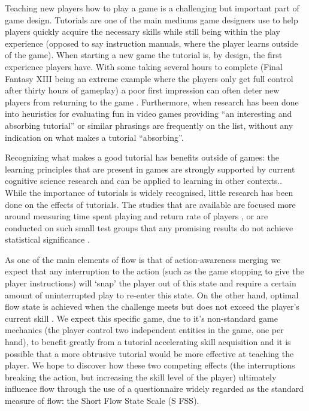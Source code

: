 \documentclass{acmsiggraph}
\begin{document}
Teaching new players how to play a game is a challenging but important part of game design. Tutorials are one of the main mediums game designers use to help players quickly acquire the necessary skills while still being within the play experience (opposed to say instruction manuals, where the player learns outside of the game). 
When starting a new game the tutorial is, by design, the first experience players have. With some taking several hours to complete (Final Fantasy XIII being an extreme example where the players only get full control after thirty hours of gameplay) a poor first impression can often deter new players from returning to the game \cite{useMMO}. Furthermore, when research has been done into heuristics for evaluating fun in video games providing ``an interesting and absorbing tutorial'' \cite{federoff} or similar phrasings \cite{desurvire} are frequently on the list, without any indication on what makes a tutorial ``absorbing''.

Recognizing what makes a good tutorial has benefits outside of games: the learning principles that are present in games are strongly supported by current cognitive science research and can be applied to learning in other contexts.\cite{videolit}.\\
While the importance of tutorials is widely recognised, little research has been done on the effects of tutorials. The studies that are available are focused more around measuring time spent playing and return rate of players \cite{andersen}, or are conducted on such small test groups that any promising results do not achieve statistical significance \cite{hill}. 



As one of the main elements of flow is that of action-awareness merging \cite{jackson} we expect that any interruption to the action (such as the game stopping to give the player instructions) will ‘snap’ the player out of this state and require a certain amount of uninterrupted play to re-enter this state.
On the other hand, optimal flow state is achieved when the challenge meets but does not exceed the player’s current skill \cite{nakamura}. We expect this specific game, due to it’s non-standard game mechanics (the player control two independent entities in the game, one per hand), to benefit greatly from a tutorial accelerating skill acquisition \cite{andersen} and it is possible that a more obtrusive tutorial would be more effective at teaching the player.
We hope to discover how these two competing effects (the interruptions breaking the action, but increasing the skill level of the player) ultimately influence flow through the use of a questionnaire widely regarded as the standard measure of flow: the Short Flow State Scale (S FSS)\cite{jackson}.
\end{document}
